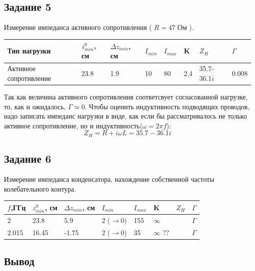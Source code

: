 \subsection{Задание 5}
Измерение импеданса активного сопротивления ( $ R = 47 $ Ом ).

\begin{table}[H]
    \centering
    \begin{tabular}{l|l|l|l|l|l|l|l}
       Тип нагрузки  & $z^0_{min}$, см & $\Delta z_{min}$, см & $I_{min}$ & $I_{max}$ & K &  $Z_H$ & $\Gamma$ \\ \hline
    Активное сопротивление &   23.8   &   1.9    &   10  &   80   &  2.4 & 35.7-36.1$i$ & 0.008 \\ 
    \end{tabular}
\end{table}

Так как величина активного сопротивления соответсвует согласованной нагрузке, то, как и ожидалось, $\Gamma \simeq 0.$
Чтобы оценить индуктивность подводящих проводов, надо записать импеданс нагрузки в виде, как если бы рассматривалось не только
активное сопротивление, но и индуктивность($ \omega = 2 \pi f $):
\begin{equation}
    Z_H = R + i\omega L =  35.7-36.1i
\end{equation}

\subsection{Задание 6}
Измерение импеданса конденсатора, нахождение собственной частоты колебательного контура.

\begin{table}[H]
    \centering
    \begin{tabular}{l|l|l|l|l|l|l|l}
       $f$,ГГц  & $z^0_{min}$, см & $\Delta z_{min}$, см & $I_{min}$ & $I_{max}$ & K &  $Z_H$ & $\Gamma$  \\ \hline
    2 &   23.8   &   5.9    &   2 ($\rightarrow 0$)  &   155   &  $\infty$ &  & $\Gamma$  \\ \hline
    2.015 &   16.45   &   -1.75    &   2 ($\rightarrow 0$)   &   35   &  $\infty$ ??    &   & $\Gamma$ 
    \end{tabular}
\end{table}

\subsection{Вывод}




